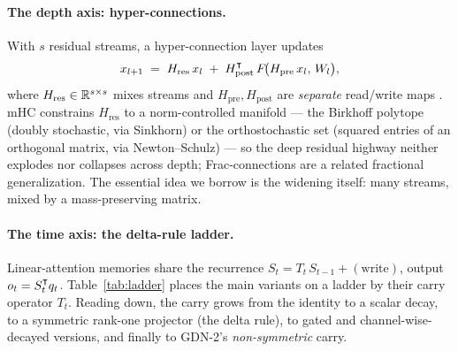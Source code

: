 \documentclass[11pt,letterpaper,logo]{yalearxiv}
\newcommand{\Tcarry}{T}                        %
\newcommand{\Hres}{H_{\mathrm{res}}}
\newcommand{\Hpre}{H_{\mathrm{pre}}}
\newcommand{\Hpost}{H_{\mathrm{post}}}
\begin{document}
\paragraph{The depth axis: hyper-connections.} With $s$ residual streams, a
hyper-connection layer updates
\begin{equation}
  x_{l+1} \;=\; \Hres\, x_l \;+\; \Hpost^{\tr}\, F\!\big(\Hpre\, x_l,\, W_l\big),
  \label{eq:hc}
\end{equation}
where $\Hres \in \R^{s\times s}$ mixes streams and $\Hpre,\Hpost$ are
\emph{separate} read/write maps \citep{zhu2024hyperconnections}. mHC
\citep{deepseek2025mhc} constrains $\Hres$ to a norm-controlled manifold --- the
Birkhoff polytope (doubly stochastic, via Sinkhorn) or the orthostochastic set
(squared entries of an orthogonal matrix, via Newton--Schulz) --- so the deep
residual highway neither explodes nor collapses across depth; Frac-connections
\citep{zhu2025fracconnections} are a related fractional generalization. The
essential idea we borrow is the widening itself: many streams, mixed by a
mass-preserving matrix.

\paragraph{The time axis: the delta-rule ladder.} Linear-attention memories share
the recurrence $S_t = \Tcarry_t\, S_{t-1} + (\text{write})$, output
$o_t = S_t^{\intercal} q_t$. Table~\ref{tab:ladder} places the main variants on a ladder
by their carry operator $\Tcarry_t$. Reading down, the carry grows from the
identity to a scalar decay, to a symmetric rank-one projector (the delta rule), to
gated and channel-wise-decayed versions, and finally to GDN-2's \emph{non-symmetric}
carry.
\end{document}
